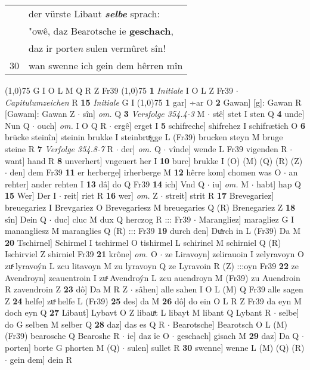\documentclass[8pt,a4paper,notitlepage]{article}
\begin{document}
\begin{table}[ht]
\begin{minipage}[t]{0.5\linewidth}
\begin{tabular}{rl}
 & der vürste Libaut \textit{\textbf{selbe}} sprach:\\ 
 & "owê, daz Bearotsche ie \textbf{geschach},\\ 
 & daz ir porte\textit{n} sulen vermûret sîn!\\ 
30 & wan swenne ich gein dem hêrren mîn\\ 
\end{tabular}
\scriptsize
\line(1,0){75} \newline
G I O L M Q R Z Fr39 \newline
\line(1,0){75} \newline
\textbf{1} \textit{Initiale} I O L Z Fr39   $\cdot$ \textit{Capitulumzeichen} R  \textbf{15} \textit{Initiale} G I  \newline
\line(1,0){75} \newline
\textbf{1} gar] ÷ar O \textbf{2} Gawan] [g]: Gawan R [Gawam]: Gawan Z  $\cdot$ sîn] \textit{om.} Q \textbf{3} \textit{Versfolge 354.4-3} M   $\cdot$ stê] stet I sten Q \textbf{4} unde] Nun Q  $\cdot$ ouch] \textit{om.} I O Q R  $\cdot$ ergê] erget I \textbf{5} schifreche] shifrehez I schifrætich O \textbf{6} brücke steinîn] steinin brukke I steinbruͯgge L (Fr39) brucken steyn M bruge steine R \textbf{7} \textit{Verfolge 354.8-7} R   $\cdot$ der] \textit{om.} Q  $\cdot$ vînde] wende L Fr39 vigenden R  $\cdot$ want] hand R \textbf{8} unverhert] vngeuert her I \textbf{10} burc] brukke I (O) (M) (Q) (R) (Z)  $\cdot$ den] dem Fr39 \textbf{11} er herberge] irherberge M \textbf{12} hêrre kom] chomen was O  $\cdot$ an rehter] ander rehten I \textbf{13} dâ] do Q Fr39 \textbf{14} ich] Vnd Q  $\cdot$ iu] \textit{om.} M  $\cdot$ habt] hap Q \textbf{15} Wer] Der I  $\cdot$ reit] riet R \textbf{16} wer] \textit{om.} Z  $\cdot$ streit] strit R \textbf{17} Brevegariez] breuegariez I Brevgariez O Brevegariesz M breuegaries Q (R) Brenegariez Z \textbf{18} sîn] Dein Q  $\cdot$ duc] cluc M dux Q herczog R ::: Fr39  $\cdot$ Marangliez] maragliez G I manangliesz M maranglies Q (R) ::: Fr39 \textbf{19} durch den] Duͯrch in L (Fr39) Da M \textbf{20} Tschirnel] Schirmel I tschirmel O tishirmel L schirinel M schirniel Q (R) Ischirviel Z shirniel Fr39 \textbf{21} krône] \textit{om.} O  $\cdot$ ze Liravoyn] zelirauoin I zelyravoyn O zuͯ lyravoýn L zcu litavoyn M zu lyravoyn Q ze Lyravoin R (Z) :::oyn Fr39 \textbf{22} ze Avendroyn] zeauentroin I zuͯ Avendroýn L zcu auendroyn M (Fr39) zu Auendroin R zavendroin Z \textbf{23} dô] Da M R Z  $\cdot$ sâhen] alle sahen I O L (M) Q Fr39 alle sagen Z \textbf{24} helfe] zuͯ helfe L (Fr39) \textbf{25} des] da M \textbf{26} dô] do ein O L R Z Fr39 da eyn M doch eyn Q \textbf{27} Libaut] Lybavt O Z libauͯt L libayt M libant Q Lybant R  $\cdot$ selbe] do G selben M selber Q \textbf{28} daz] das es Q R  $\cdot$ Bearotsche] Bearotsch O L (M) (Fr39) bearosche Q Bearoshe R  $\cdot$ ie] daz îe O  $\cdot$ geschach] gisach M \textbf{29} daz] Da Q  $\cdot$ porten] borte G phorten M (Q)  $\cdot$ sulen] sullet R \textbf{30} swenne] wenne L (M) (Q) (R)  $\cdot$ gein dem] dein R \newline

\end{minipage}
\end{table}
\end{document}

